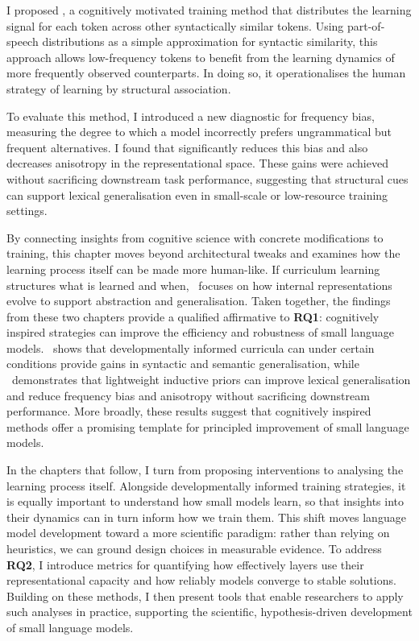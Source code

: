 I proposed \smoothing, a cognitively motivated training method that distributes the learning signal for each token across other syntactically similar tokens. Using part-of-speech distributions as a simple approximation for syntactic similarity, this approach allows low-frequency tokens to benefit from the learning dynamics of more frequently observed counterparts. In doing so, it operationalises the human strategy of learning by structural association.

To evaluate this method, I introduced a new diagnostic for frequency bias, measuring the degree to which a model incorrectly prefers ungrammatical but frequent alternatives. I found that \smoothing significantly reduces this bias and also decreases anisotropy in the representational space. These gains were achieved without sacrificing downstream task performance, suggesting that structural cues can support lexical generalisation even in small-scale or low-resource training settings.

By connecting insights from cognitive science with concrete modifications to training, this chapter moves beyond architectural tweaks and examines how the learning process itself can be made more human-like. If curriculum learning structures what is learned and when, \smoothing\ focuses on how internal representations evolve to support abstraction and generalisation. Taken together, the findings from these two chapters provide a qualified affirmative to \textbf{RQ1}: cognitively inspired strategies can improve the efficiency and robustness of small language models. \climb\ shows that developmentally informed curricula can under certain conditions provide gains in syntactic and semantic generalisation, while \smoothing\ demonstrates that lightweight inductive priors can improve lexical generalisation and reduce frequency bias and anisotropy without sacrificing downstream performance. More broadly, these results suggest that cognitively inspired methods offer a promising template for principled improvement of small language models.

In the chapters that follow, I turn from proposing interventions to analysing the learning process itself. Alongside developmentally informed training strategies, it is equally important to understand how small models learn, so that insights into their dynamics can in turn inform how we train them. This shift moves language model development toward a more scientific paradigm: rather than relying on heuristics, we can ground design choices in measurable evidence. To address \textbf{RQ2}, I introduce metrics for quantifying how effectively layers use their representational capacity and how reliably models converge to stable solutions. Building on these methods, I then present tools that enable researchers to apply such analyses in practice, supporting the scientific, hypothesis-driven development of small language models.





